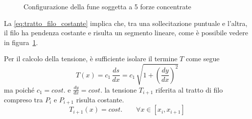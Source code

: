 \begin{figure}
  \centering
  

\caption{Configurazione della fune soggetta a 5 forze concentrate}
\label{fig:fune_forze_concentrate}
   
\end{figure}

La \eqref{eq:tratto_filo_costante} implica che, tra una sollecitazione puntuale e l'altra, il filo ha pendenza costante e risulta un segmento lineare, come è possibile vedere in figura~\ref{fig:fune_forze_concentrate}.

Per il calcolo della tensione, è sufficiente isolare il termine $T$ come segue
\[
T(x) = c_1\,\dfrac{ds}{dx} = c_1\,\sqrt{1+\left(\dfrac{dy}{dx}\right)^2}
\]
ma poiché $c_1 = cost.$ e $\frac{dy}{dx} = cost.$ la tensione $T_{i+1}$ riferita al tratto di filo compreso tra $P_i$ e $P_{i+1}$ risulta costante.
\begin{equation}
\label{eq:tensione_costante}
T_{i+1}(x) = cost.\qquad \forall x \in [x_i, x_{i+1}]
\end{equation}

